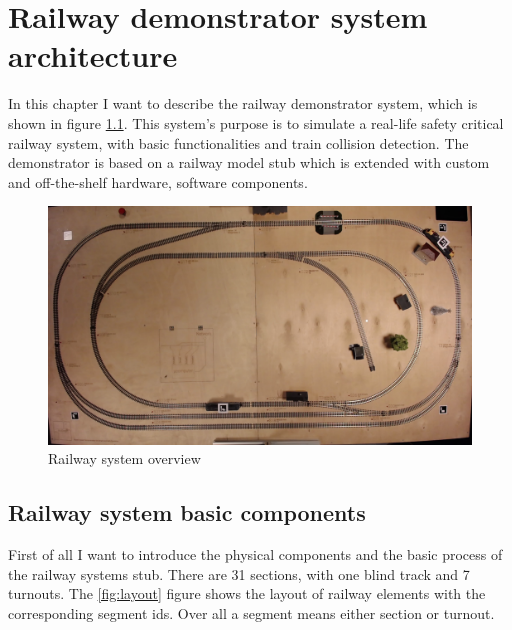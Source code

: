 
\chapter{Railway demonstrator system architecture}\label{chapter:RailwaySystem}
In this chapter I want to describe the railway demonstrator system, which is shown in figure \ref{fig:overview}. This system's purpose is to simulate a real-life safety critical railway system, with basic functionalities and train collision detection. The demonstrator is based on a railway model stub which is extended with custom and off-the-shelf hardware, software components. 
\begin{figure}[h]
	\centering
	\includegraphics[width=150mm, keepaspectratio,  angle =180 ]{figures/modes3/overview.jpg}
	\caption{Railway system overview}
	\label{fig:overview}
\end{figure}

\section{Railway system basic components}
First of all I want to introduce the physical components and the basic process of the railway systems stub. There are 31 sections, with one blind track and 7 turnouts. The \ref{fig:layout} figure shows the layout of railway elements with the corresponding segment ids. Over all a segment means either section or turnout.

